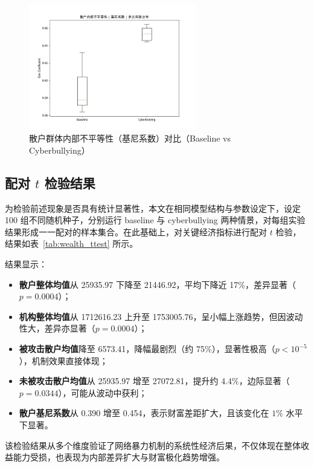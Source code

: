 \begin{figure}[htbp]
    \centering
    \includegraphics[width=0.65\textwidth]{image/fig4_7_gini_comparison_boxplot.png}
    \caption{散户群体内部不平等性（基尼系数）对比（Baseline vs Cyberbullying）}
    \label{fig:gini_comparison_boxplot}
\end{figure}





\subsection{配对 \( t \) 检验结果}

为检验前述现象是否具有统计显著性，本文在相同模型结构与参数设定下，设定 100 组不同随机种子，分别运行 baseline 与 cyberbullying 两种情景，对每组实验结果形成一一配对的样本集合。在此基础上，对关键经济指标进行配对 \(t\) 检验，结果如表~\ref{tab:wealth_ttest} 所示。

结果显示：

\begin{itemize}
  \item \textbf{散户整体均值}从 25935.97 下降至 21446.92，平均下降近 17\%，差异显著（\(p = 0.0004\)）；
  \item \textbf{机构整体均值}从 1712616.23 上升至 1753005.76，呈小幅上涨趋势，但因波动性大，差异亦显著（\(p = 0.0004\)）；
  \item \textbf{被攻击散户均值}降至 6573.41，降幅最剧烈（约 75\%），显著性极高（\(p < 10^{-5}\)），机制效果直接体现；
  \item \textbf{未被攻击散户均值}从 25935.97 增至 27072.81，提升约 4.4\%，边际显著（\(p = 0.0344\)），可能从波动中获利；
  \item \textbf{散户基尼系数}从 0.390 增至 0.454，表示财富差距扩大，且该变化在 \(1\%\) 水平下显著。
\end{itemize}

该检验结果从多个维度验证了网络暴力机制的系统性经济后果，不仅体现在整体收益能力受损，也表现为内部差异扩大与财富极化趋势增强。

